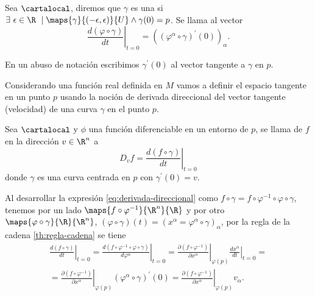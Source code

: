 \begin{definition}
  Sea $\cartalocal$, diremos que $\gamma$ es una  si $\exists\ \epsilon\in\R \ \mid \maps{\gamma}{(-\epsilon,\epsilon)}{U}\land
  \gamma(0)=p$.
  Se llama  al vector
  \begin{equation}
    \label{eq:derivada-curva}
    \left.\frac{d(\varphi\circ\gamma)
    }{dt}\right|_{t=0}=((\varphi^\alpha\circ\gamma)^{'}(0))_\alpha.
  \end{equation}
\end{definition}
\begin{notation}
  En un abuso de notación escribimos $\gamma^{'}(0)$ al vector tangente a $\gamma$ en $p$.
\end{notation}

Considerando una función real definida en $M$ vamos a definir el espacio tangente en un
punto $p$ usando la noción de derivada direccional del vector tangente (velocidad) de una curva
$\gamma$ en el punto $p$.

\begin{definition}
  Sea $\cartalocal$ y $\phi$ una función diferenciable en un entorno de $p$, se llama
   de $f$ en la dirección $v\in\R^n$ a
  \begin{equation}
    D_vf=\label{eq:derivada-direccional}
    \left.\frac{d(f\circ\gamma)}{dt}\right|_{t=0}
  \end{equation}
  donde $\gamma$ es una curva centrada en $p$ con $\gamma^{'}(0)=v$.
\end{definition}

Al desarrollar la expresión \ref{eq:derivada-direccional} como
$f\circ\gamma=f\circ\varphi^{-1}\circ\varphi\circ\gamma$, tenemos por un lado
$\maps{f\circ\varphi^{-1}}{\R^n}{\R}$
y por otro
$\maps{\varphi\circ\gamma}{\R}{\R^n}$, $(\varphi\circ\gamma)(t)=
(x^\alpha=\varphi^\alpha\circ\gamma)_{\alpha}$,
por la regla de la cadena \ref{th:regla-cadena} se tiene
\begin{multline}\label{eq:desarrollo-derivada-direccional}
  \left.\frac{d(f\circ\gamma)}{dt}\right|_{t=0}=
  \left.\frac{d(f\circ\varphi^{-1}\circ\varphi\circ\gamma)}{d\varphi^\alpha}\right|_{t=0}=
  \left.\frac{\partial(f\circ\varphi^{-1})}{\partial x^\alpha}\right|_{\varphi(p)}\left.\frac{d
  x^\alpha  }{dt}\right|_{t=0}=\\
  =\left.\frac{\partial(f\circ\varphi^{-1})}{\partial x^\alpha}\right|_{\varphi(p)}\left.
  (\varphi^\alpha\circ\gamma)^{'}(0)=\left.\frac{\partial(f\circ\varphi^{-1})}{\partial x^\alpha}\right|_{\varphi(p)}\left.
  v_\alpha.
\end{multline}


